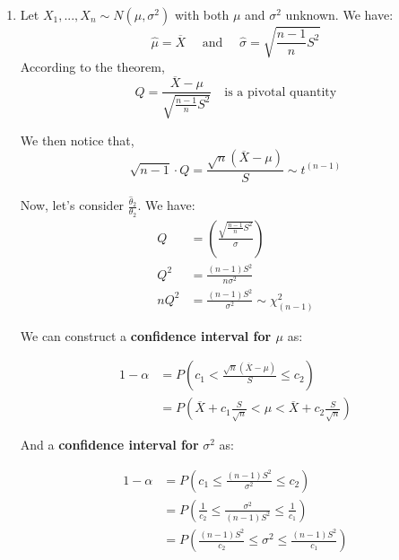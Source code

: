 \documentclass{article}
\begin{document}
\begin{enumerate}
    \item Let $X_1,...,X_n \sim N(\mu,\sigma^2)$ with both $\mu$ and $\sigma^2$ unknown. We have:
    \begin{equation*}
        \hat{\mu} = \overline{X} \quad \text{ and } \quad \hat{\sigma} = \sqrt{\frac{n-1}{n}S^2}
    \end{equation*}
    According to the theorem,
    \begin{equation*}
        Q = \frac{\overline{X}-\mu}{\sqrt{\frac{n-1}{n}S^2}} \quad \text{is a pivotal quantity}
    \end{equation*}
    
    We then notice that,
    \begin{equation*}
        \sqrt{n-1} \cdot Q = \frac{\sqrt{n}(\overline{X}-\mu)}{S} \sim t^{(n-1)}
    \end{equation*}
    
    Now, let's consider $\frac{\hat{\theta}_2}{\theta_2}$. We have:
    \begin{equation*}
        \begin{split}
            Q &= \left(\frac{\sqrt{\frac{n-1}{n}S^2}}{\sigma} \right)\\
            Q^2 &= \frac{(n-1)S^2}{n\sigma^2}\\
            nQ^2 &= \frac{(n-1)S^2}{\sigma^2} \sim \chi_{(n-1)}^2
        \end{split}
    \end{equation*}
    
    We can construct a\textbf{ confidence interval for $\mu$} as:
    
    \begin{equation*}
        \begin{split}
            1-\alpha &= P\left(c_1 < \frac{\sqrt{n}(\overline{X}-\mu)}{S} \leq c_2 \right)\\
            &= P\left( \overline{X}+c_1\frac{S}{\sqrt{n}} < \mu < \overline{X} + c_2\frac{S}{\sqrt{n}} \right)
        \end{split}
    \end{equation*}
    
    And a \textbf{confidence interval for } $\sigma^2$ as:
    
    \begin{equation*}
        \begin{split}
            1-\alpha &= P\left( c_1 \leq \frac{(n-1)S^2}{\sigma^2} \leq c_2 \right)\\
            &= P \left(\frac{1}{c_2} \leq \frac{\sigma^2}{(n-1)S^2} \leq \frac{1}{c_1} \right)\\
            &= P\left(\frac{(n-1)S^2}{c_2} \leq \sigma^2 \leq \frac{(n-1)S^2}{c_1} \right)
        \end{split}
    \end{equation*}
\end{enumerate}
\end{document}
